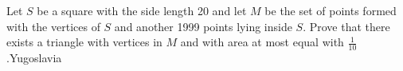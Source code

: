 Let $S$ be a square with the side length 20 and let $M$ be the set of points formed with the vertices of $S$ and another 1999 points lying inside $S$. Prove that there exists a triangle with vertices in $M$ and with area at most equal with $\frac 1{10}$.Yugoslavia